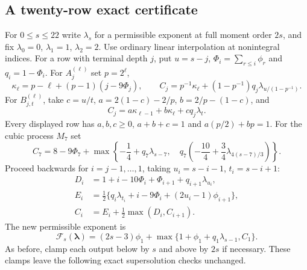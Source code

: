 \documentclass[11pt,reqno]{amsart}
\numberwithin{equation}{section}
\theoremstyle{definition}
\begin{document}
\subsection{A twenty-row exact certificate}

For $0\le s\le22$ write $\lambda_s$ for a permissible exponent at full
moment order $2s$, and fix $\lambda_0=0$, $\lambda_1=1$, $\lambda_2=2$.
Use ordinary linear interpolation at nonintegral indices.  For a row with
terminal depth $j$, put $u=s-j$, $\Phi_i=\sum_{r\le i}\phi_r$ and
$q_i=1-\Phi_i$.  For $A_j^{(\ell)}$ set $p=2^\ell$,
\[
 \kappa_\ell=p-\ell+(p-1)(j-9\Phi_j),\qquad
 C_j=p^{-1}\kappa_\ell+(1-p^{-1})q_j\lambda_{u/(1-p^{-1})}.
\]
For $B_{j,t}^{(\ell)}$, take
$c=u/t$, $a=2(1-c)-2/p$, $b=2/p-(1-c)$, and
\[
 C_j=a\kappa_{\ell-1}+b\kappa_\ell+cq_j\lambda_t.
\]
Every displayed row has $a,b,c\ge0$, $a+b+c=1$ and $a(p/2)+bp=1$.
For the cubic process $M_7$ set
\[
 C_7=8-9\Phi_7+
 \max\left\{-\frac14+q_7\lambda_{s-7},\quad
 q_7\left(-\frac{10}{4}+\frac34\lambda_{4(s-7)/3}\right)\right\}.
\]
Proceed backwards for $i=j-1,\ldots,1$, taking $u_i=s-i-1$, $t_i=s-i+1$:
\begin{align*}
 D_i&=1+i-10\Phi_i+\Phi_{i+1}+q_{i+1}\lambda_{u_i},\\
 E_i&=\frac12\{q_i\lambda_{t_i}+i-9\Phi_i+(2u_i-1)\phi_{i+1}\},\\
 C_i&=E_i+\frac12\max(D_i,C_{i+1}).
\end{align*}
The new permissible exponent is
\[
 \mathcal F_s(\boldsymbol\lambda)
   =(2s-3)\phi_1+
    \max\{1+\phi_1+q_1\lambda_{s-1},C_1\}.
\]
As before, clamp each output below by $s$ and above by $2s$ if necessary.
These clamps leave the following exact supersolution checks unchanged.
\end{document}
